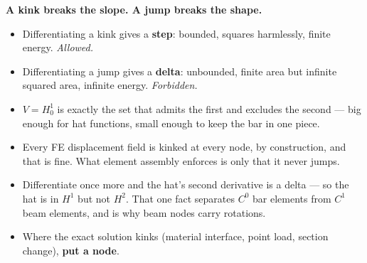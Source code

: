 \documentclass[11pt]{article}
\begin{document}
\begin{intuition}
\textbf{A kink breaks the slope. A jump breaks the shape.}
\begin{itemize}[leftmargin=1.4em,itemsep=3pt]
  \item Differentiating a kink gives a \textbf{step}: bounded, squares
        harmlessly, finite energy. \emph{Allowed.}
  \item Differentiating a jump gives a \textbf{delta}: unbounded, finite area
        but infinite squared area, infinite energy. \emph{Forbidden.}
  \item $V=H^{1}_{0}$ is exactly the set that admits the first and excludes the
        second --- big enough for hat functions, small enough to keep the bar
        in one piece.
  \item Every FE displacement field is kinked at every node, by construction,
        and that is fine. What element assembly enforces is only that it never
        jumps.
  \item Differentiate once more and the hat's second derivative is a delta ---
        so the hat is in $H^{1}$ but not $H^{2}$. That one fact separates
        $C^{0}$ bar elements from $C^{1}$ beam elements, and is why beam nodes
        carry rotations.
  \item Where the exact solution kinks (material interface, point load, section
        change), \textbf{put a node}.
\end{itemize}
\end{intuition}
\end{document}
